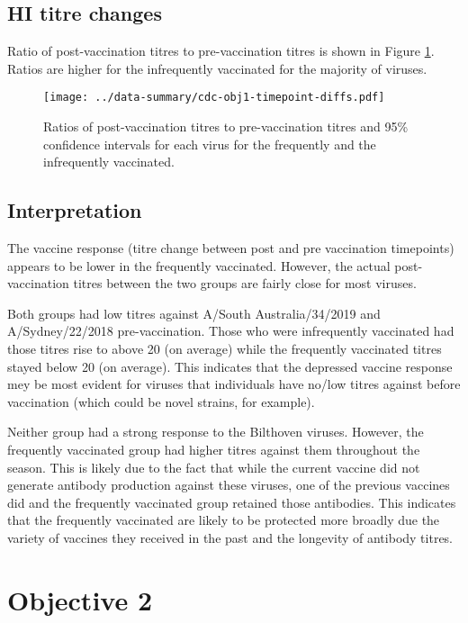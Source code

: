 \documentclass[12pt]{article}
\begin{document}
\subsection{HI titre changes}

Ratio of post-vaccination titres to pre-vaccination titres is shown in Figure
\ref{fig:cdc-obj1-timepoint-diffs}. Ratios are higher for the infrequently
vaccinated for the majority of viruses.

\begin{figure}
	\texttt{[image: ../data-summary/cdc-obj1-timepoint-diffs.pdf]}
	\caption{Ratios of post-vaccination titres to pre-vaccination titres and 95\% confidence intervals for each virus for the frequently and the infrequently vaccinated.}
	\label{fig:cdc-obj1-timepoint-diffs}
\end{figure}

\subsection{Interpretation}

The vaccine response (titre change between post and pre vaccination timepoints)
appears to be lower in the frequently vaccinated. However, the actual
post-vaccination titres between the two groups are fairly close for most viruses.

Both groups had low titres against A/South Australia/34/2019 and A/Sydney/22/2018 pre-vaccination. Those who were infrequently vaccinated had those titres rise to above 20 (on average) while the frequently vaccinated titres stayed below 20 (on average). This indicates that the depressed vaccine response mey be most evident for viruses that individuals have no/low titres against before vaccination (which could be novel strains, for example).

Neither group had a strong response to the Bilthoven viruses. However, the frequently vaccinated group had higher titres against them throughout the season. This is likely due to the fact that while the current vaccine did not generate antibody production against these viruses, one of the previous vaccines did and the frequently vaccinated group retained those antibodies. This indicates that the frequently vaccinated are likely to be protected more broadly due the variety of vaccines they received in the past and the longevity of antibody titres.

\section{Objective 2}
\end{document}
